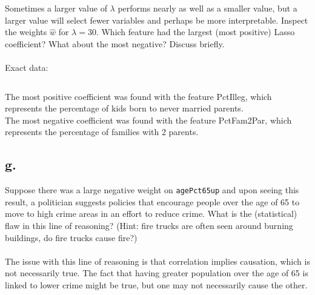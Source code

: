 \documentclass{article}
\newcommand{\1}{\mathbf{1}}
\begin{document}
{Sometimes a larger value of $\lambda$ performs nearly as well as a smaller value, but a larger value will select fewer variables and perhaps be more interpretable.  Inspect the weights $\hat{w}$ for $\lambda = 30$.  Which feature
    had the largest (most positive) Lasso coefficient? What about the most negative? Discuss briefly. \\ \\

Exact data:
\begin{verbatim}
\end{verbatim}

The most positive coefficient was found with the feature PctIlleg, which represents the percentage of kids born to never married parents. \\
The most negative coefficient was found with the feature PctFam2Par, which represents the percentage of families with 2 parents.

\subsection*{g.}

Suppose there was a large negative weight on
    \texttt{agePct65up} and upon seeing this result, a politician suggests policies that encourage people over the age of 65 to move to high crime areas in an effort to reduce crime. What is the (statistical) flaw in this line of reasoning? (Hint: fire trucks
    are often seen around burning buildings, do fire trucks cause fire?) \\ \\
The issue with this line of reasoning is that correlation implies causation, which is not necessarily true. The fact that having greater population over the age of 65 is linked to lower crime might be true, but one may not necessarily cause the other. 

}
\end{document}
